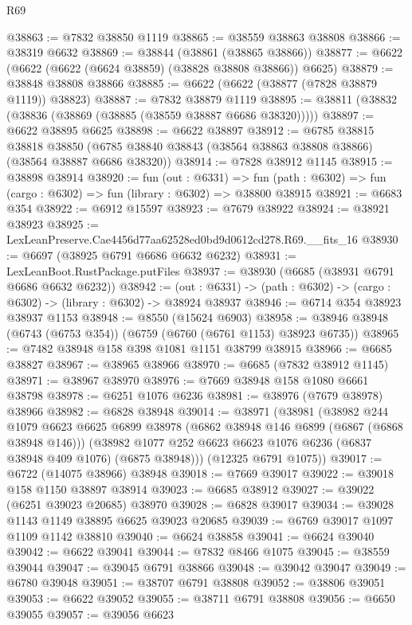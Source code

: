 \begin{lexlean}{R69}
\begin{coremodule}
{@38863 := @7832 @38850 @1119
@38865 := @38559 @38863 @38808
@38866 := @38319 @6632
@38869 := @38844 (@38861 (@38865 @38866))
@38877 := @6622 (@6622 (@6622 (@6624 @38859) (@38828 @38808 @38866)) @6625)
@38879 := @38848 @38808 @38866
@38885 := @6622 (@6622 (@38877 (@7828 @38879 @1119)) @38823)
@38887 := @7832 @38879 @1119
@38895 := @38811 (@38832 (@38836 (@38869 (@38885 (@38559 @38887 @6686 @38320)))))
@38897 := @6622 @38895 @6625
@38898 := @6622 @38897
@38912 := @6785
    @38815
    @38818
    @38850
    (@6785 @38840 @38843 (@38564 @38863 @38808 @38866) (@38564 @38887 @6686 @38320))
@38914 := @7828 @38912 @1145
@38915 := @38898 @38914
@38920 := fun (out : @6331) =>
  fun (path : @6302) => fun (cargo : @6302) => fun (library : @6302) => @38800 @38915
@38921 := @6683 @354
@38922 := @6912 @15597
@38923 := @7679 @38922
@38924 := @38921 @38923
@38925 := LexLeanPreserve.Cae4456d77aa62528ed0bd9d0612cd278.R69.__fits_16
@38930 := @6697 (@38925 @6791 @6686 @6632 @6232)
@38931 := LexLeanBoot.RustPackage.putFiles
@38937 := @38930 (@6685 (@38931 @6791 @6686 @6632 @6232))
@38942 := (out : @6331) -> (path : @6302) -> (cargo : @6302) -> (library : @6302) -> @38924 @38937
@38946 := @6714 @354 @38923 @38937 @1153
@38948 := @8550 (@15624 @6903)
@38958 := @38946 @38948 (@6743 (@6753 @354)) (@6759 (@6760 (@6761 @1153) @38923 @6735))
@38965 := @7482 @38948 @158 @398 @1081 @1151 @38799 @38915
@38966 := @6685 @38827
@38967 := @38965 @38966
@38970 := @6685 (@7832 @38912 @1145)
@38971 := @38967 @38970
@38976 := @7669 @38948 @158 @1080 @6661 @38798
@38978 := @6251 @1076 @6236
@38981 := @38976 (@7679 @38978) @38966
@38982 := @6828 @38948
@39014 := @38971
    (@38981
      (@38982
        @244
        @1079
        @6623
        @6625
        @6899
        @38978
        (@6862 @38948 @146 @6899 (@6867 (@6868 @38948 @146)))
        (@38982 @1077 @252 @6623 @6623 @1076 @6236 (@6837 @38948 @409 @1076) (@6875 @38948)))
      (@12325 @6791 @1075))
@39017 := @6722 (@14075 @38966) @38948
@39018 := @7669 @39017
@39022 := @39018 @158 @1150 @38897 @38914
@39023 := @6685 @38912
@39027 := @39022 (@6251 @39023 @20685) @38970
@39028 := @6828 @39017
@39034 := @39028 @1143 @1149 @38895 @6625 @39023 @20685
@39039 := @6769 @39017 @1097 @1109 @1142 @38810
@39040 := @6624 @38858
@39041 := @6624 @39040
@39042 := @6622 @39041
@39044 := @7832 @8466 @1075
@39045 := @38559 @39044
@39047 := @39045 @6791 @38866
@39048 := @39042 @39047
@39049 := @6780 @39048
@39051 := @38707 @6791 @38808
@39052 := @38806 @39051
@39053 := @6622 @39052
@39055 := @38711 @6791 @38808
@39056 := @6650 @39055
@39057 := @39056 @6623
}
\end{coremodule}
\end{lexlean}
